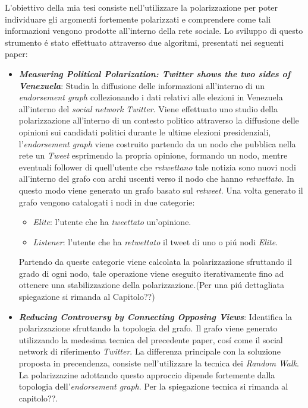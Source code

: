 L'obiettivo della mia tesi consiste nell'utilizzare la polarizzazione per poter individuare gli argomenti fortemente polarizzati e comprendere come tali informazioni vengono prodotte all'interno della rete sociale.
Lo sviluppo di questo strumento \'e stato effettuato attraverso due algoritmi, presentati nei seguenti paper:
\begin{itemize}
\item \textbf{\textit{Measuring Political Polarization: Twitter shows the two sides of Venezuela}}:
Studia la diffusione delle informazioni all'interno di un \textit{endorsement graph} collezionando i dati relativi alle elezioni in Venezuela all'interno del \textit{social network Twitter}. Viene effettuato uno studio della polarizzazione all'interno di un contesto politico attraverso la diffusione delle opinioni sui candidati politici durante le ultime elezioni presidenziali, l'\textit{endorsement graph} viene costruito partendo da un nodo che pubblica nella rete un \textit{Tweet} esprimendo la propria opinione, formando un nodo, mentre eventuali follower di quell'utente che \textit{retwettano} tale notizia sono nuovi nodi all'interno del grafo con archi uscenti verso il nodo che hanno \textit{retwettato}. In questo modo viene generato un grafo basato sul \textit{retweet}.
Una volta generato il grafo vengono catalogati i nodi in due categorie:
\begin{itemize}
\item \textit{Elite}: l'utente che ha \textit{tweettato} un'opinione.
\item \textit{Listener}: l'utente che ha \textit{retwettato} il tweet di uno o pi\'u nodi \textit{Elite}.
\end{itemize}
Partendo da queste categorie viene calcolata la polarizzazione sfruttando il grado di ogni nodo, tale operazione viene eseguito iterativamente fino ad ottenere una stabilizzazione della polarizzazione.(Per una pi\'u dettagliata spiegazione si rimanda al Capitolo??)

\item \textbf{\textit{Reducing Controversy by Connecting Opposing Views}}:
Identifica la polarizzazione sfruttando la topologia del grafo. Il grafo viene generato utilizzando la medesima tecnica del precedente paper, cos\'i come il social network di riferimento \textit{Twitter}. %
La differenza principale con la soluzione proposta in precendenza, consiste nell'utilizzare la tecnica dei \textit{Random Walk}. La polarizzazine adottando questo approccio dipende fortemente dalla topologia dell'\textit{endorsement graph}. Per la spiegazione tecnica si rimanda al capitolo??.
\end{itemize}

